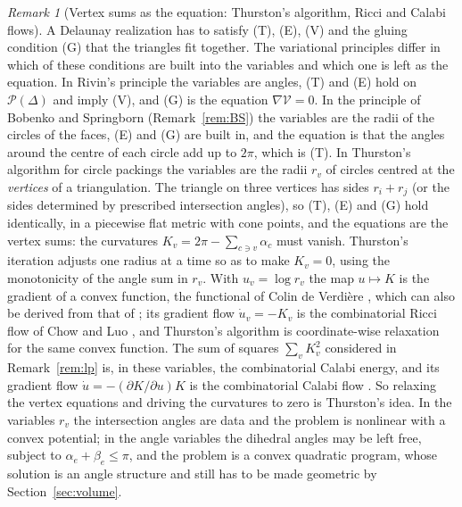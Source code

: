 \documentclass[11pt]{amsart}
\theoremstyle{definition}
\theoremstyle{remark}
\newtheorem{remark}[theorem]{Remark}
\begin{document}
\begin{remark}[Vertex sums as the equation: Thurston's algorithm, Ricci and Calabi flows]\label{rem:thurston}
A Delaunay realization has to satisfy \textup{(T)}, \textup{(E)}, \textup{(V)} and the gluing condition \textup{(G)} that the triangles fit together. The variational principles differ in which of these conditions are built into the variables and which one is left as the equation.
In Rivin's principle the variables are angles, \textup{(T)} and \textup{(E)} hold on $\mathcal P(\Delta)$ and imply \textup{(V)}, and \textup{(G)} is the equation $\nabla\mathcal V=0$. In the principle of Bobenko and Springborn (Remark~\ref{rem:BS}) the variables are the radii of the circles of the faces,
\textup{(E)} and \textup{(G)} are built in, and the equation is that the angles around the centre of each circle add up to $2\pi$, which is \textup{(T)}.
In Thurston's algorithm for circle packings \cite{CS03} the variables are the radii $r_v$ of circles centred at the \emph{vertices} of a triangulation. The triangle on three vertices has sides $r_i+r_j$ (or the sides determined by prescribed intersection angles), so \textup{(T)}, \textup{(E)} and \textup{(G)} hold identically, in a piecewise flat metric with cone points,
and the equations are the vertex sums: the curvatures $K_v=2\pi-\sum_{c\ni v}\alpha_c$ must vanish. Thurston's iteration adjusts one radius at a time so as to make $K_v=0$, using the monotonicity of the angle sum in $r_v$.
With $u_v=\log r_v$ the map $u\mapsto K$ is the gradient of a convex function, the functional of Colin de Verdi\`ere \cite{CdV91}, which can also be derived from that of \cite{BS04}; its gradient flow $\dot u_v=-K_v$ is the combinatorial Ricci flow of Chow and Luo \cite{CL03}, and Thurston's algorithm is coordinate-wise relaxation for the same convex function.
The sum of squares $\sum_vK_v^2$ considered in Remark~\ref{rem:lp} is, in these variables, the combinatorial Calabi energy, and its gradient flow $\dot u=-(\partial K/\partial u)K$ is the combinatorial Calabi flow \cite{Ge18}.
So relaxing the vertex equations and driving the curvatures to zero is Thurston's idea. In the variables $r_v$ the intersection angles are data and the problem is nonlinear with a convex potential; in the angle variables the dihedral angles may be left free, subject to $\alpha_e+\beta_e\le\pi$, and the problem is a convex quadratic program, whose solution is an angle structure and still has to be made geometric by Section~\ref{sec:volume}.


\end{remark}
\end{document}
